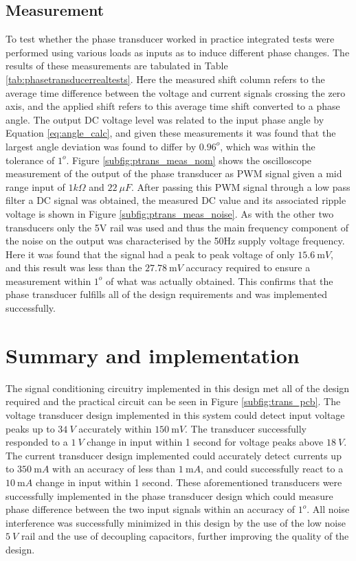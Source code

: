 \subsection{Measurement} \label{sec:ptrans_meas}
To test whether the phase transducer worked in practice integrated tests were performed using various loads as inputs as to induce different phase changes. The results of these measurements are tabulated in Table \ref{tab:phasetransducerrealtests}. Here the measured shift column refers to the average time difference between the voltage and current signals crossing the zero axis, and the applied shift refers to this average time shift converted to a phase angle. \vspace{4mm} \newline 
The output DC voltage level was related to the input phase angle by Equation \ref{eq:angle_calc}, and given these measurements it was found that the largest angle deviation was found to differ by $0.96^o$, which was within the tolerance of $1^o$. Figure \ref{subfig:ptrans_meas_nom} shows the oscilloscope measurement of the output of the phase transducer as PWM signal given a mid range input of $1k\Omega$ and $\SI{22}{\mu F}$. After passing this PWM signal through a low pass filter a DC signal was obtained, the measured DC value and its associated ripple voltage is shown in Figure \ref{subfig:ptrans_meas_noise}. As with the other two transducers only the 5V rail was used and thus the main frequency component of the noise on the output was characterised by the 50Hz supply voltage frequency. Here it was found that the signal had a peak to peak voltage of only $\SI{15.6}{\milli V}$, and this result was less than the $\SI{27.78}{\milli V}$ accuracy required to ensure a measurement within $1^o$ of what was actually obtained. This confirms that the phase transducer fulfills all of the design requirements and was implemented successfully.

\section{Summary and implementation}
The signal conditioning circuitry implemented in this design met all of the design required and the practical circuit can be seen in Figure \ref{subfig:trans_pcb}. The voltage transducer design implemented in this system could detect input voltage peaks up to $\SI{34}{V}$ accurately within $\SI{150}{\milli V}$. The transducer successfully responded to a $\SI{1}{V}$ change in input within 1 second for voltage peaks above $\SI{18}{V}$. The current transducer design implemented could accurately detect currents up to $\SI{350}{\milli A}$ with an accuracy of less than $\SI{1}{\milli A}$, and could successfully react to a $\SI{10}{\milli A}$ change in input within 1 second. These aforementioned transducers were successfully implemented in the phase transducer design which could measure phase difference between the two input signals within an accuracy of $1^o$. All noise interference was successfully minimized in this design by the use of the low noise $\SI{5}{V}$ rail and the use of decoupling capacitors, further improving the quality of the design.

